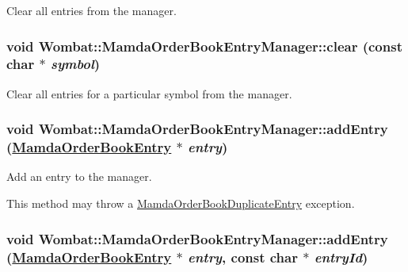 Clear all entries from the manager. 

\hypertarget{classWombat_1_1MamdaOrderBookEntryManager_25e04f50ab6d5f5e24e5fd9d43f5ff27}{
\subsubsection[clear]{\setlength{\rightskip}{0pt plus 5cm}void Wombat::Mamda\-Order\-Book\-Entry\-Manager::clear (const char $\ast$ {\em symbol})}}
\label{classWombat_1_1MamdaOrderBookEntryManager_25e04f50ab6d5f5e24e5fd9d43f5ff27}


Clear all entries for a particular symbol from the manager. 

\hypertarget{classWombat_1_1MamdaOrderBookEntryManager_719fcdc67e4e6c34285ad7608138ca3d}{
\subsubsection[addEntry]{\setlength{\rightskip}{0pt plus 5cm}void Wombat::Mamda\-Order\-Book\-Entry\-Manager::add\-Entry (\hyperlink{classWombat_1_1MamdaOrderBookEntry}{Mamda\-Order\-Book\-Entry} $\ast$ {\em entry})}}
\label{classWombat_1_1MamdaOrderBookEntryManager_719fcdc67e4e6c34285ad7608138ca3d}


Add an entry to the manager. 

This method may throw a \hyperlink{classWombat_1_1MamdaOrderBookDuplicateEntry}{Mamda\-Order\-Book\-Duplicate\-Entry} exception. \hypertarget{classWombat_1_1MamdaOrderBookEntryManager_497e2518466b4b2c9919cdd9a6c0a742}{
\subsubsection[addEntry]{\setlength{\rightskip}{0pt plus 5cm}void Wombat::Mamda\-Order\-Book\-Entry\-Manager::add\-Entry (\hyperlink{classWombat_1_1MamdaOrderBookEntry}{Mamda\-Order\-Book\-Entry} $\ast$ {\em entry}, const char $\ast$ {\em entry\-Id})}}
\label{classWombat_1_1MamdaOrderBookEntryManager_497e2518466b4b2c9919cdd9a6c0a742}


